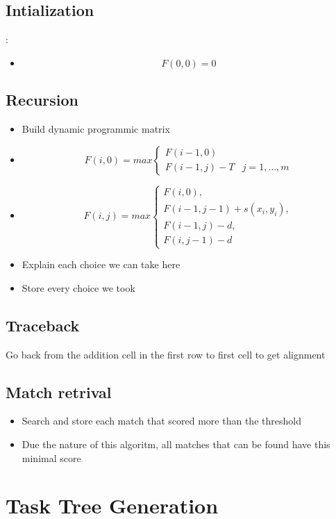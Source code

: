 \subsection{Intialization}:
	\begin{itemize}
		\item \[F(0,0) = 0\]
	\end{itemize}

\subsection{Recursion}
	\begin{itemize}
		\item Build dynamic programmic matrix
		\item  \[F(i,0) = max \left\{ \begin{array}{lr}F(i-1,0)&\\F(i-1,j)-T& j=1,\dots,m\end{array}\right. \]
		\item  \[F(i,j) = max \left\{ \begin{array}{lr}F(i,0),\\F(i-1,j-1)+s(x_i,y_i),\\F(i-1,j)-d,\\F(i,j-1)-d\end{array}\right.\]
		\item Explain each choice we can take here
		\item Store every choice we took
	\end{itemize}
\subsection{Traceback}
Go back from the addition cell in the first row to first cell to get alignment

\subsection{Match retrival}
	\begin{itemize}
		\item Search and store  each match that scored more than the threshold
		\item Due the nature of this algoritm, all matches that can be found have this minimal score
	\end{itemize}

\section{Task Tree Generation}


